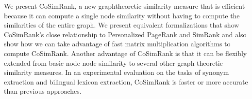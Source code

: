 We present CoSimRank, a new graphtheoretic similarity measure that is efficient because it can compute a single node similarity without having to compute the similarities of the entire graph. We present equivalent formalizations that show CoSimRank's close relationship to Personalized PageRank and SimRank and also show how we can take advantage of fast matrix multiplication algorithms to compute CoSimRank. Another advantage of CoSimRank is that it can be flexibly extended from basic node-node similarity to several other graph-theoretic similarity measures. In an experimental evaluation on the tasks of synonym extraction and bilingual lexicon extraction, CoSimRank is faster or more accurate than previous approaches.
